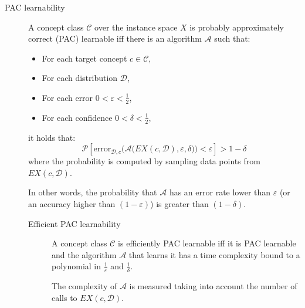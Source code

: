 \begin{description}
    \item[PAC learnability] 
        A concept class $\mathcal{C}$ over the instance space $X$ is probably approximately correct (PAC) learnable iff there is an algorithm $\mathcal{A}$ such that:
        \begin{itemize}
            \item For each target concept $c \in \mathcal{C}$,
            \item For each distribution $\mathcal{D}$, 
            \item For each error $0 < \varepsilon < \frac{1}{2}$,
            \item For each confidence $0 < \delta < \frac{1}{2}$,
        \end{itemize}
        it holds that:
        \[ \mathcal{P}\left[ \text{error}_{\mathcal{D}, c}\Big( \mathcal{A}\big( EX(c, \mathcal{D}), \varepsilon, \delta \big) \Big) < \varepsilon \right] > 1-\delta \]
        where the probability is computed by sampling data points from $EX(c, \mathcal{D})$.

        In other words, the probability that $\mathcal{A}$ has an error rate lower than $\varepsilon$ (or an accuracy higher than $(1-\varepsilon)$) is greater than $(1-\delta)$.

        \begin{description}
            \item[Efficient PAC learnability] 
                A concept class $\mathcal{C}$ is efficiently PAC learnable iff
                it is PAC learnable and the algorithm $\mathcal{A}$ that learns it has 
                a time complexity bound to a polynomial in $\frac{1}{\varepsilon}$ and $\frac{1}{\delta}$.

                \begin{remark}
                    The complexity of $\mathcal{A}$ is measured taking into account the number of calls to $EX(c, \mathcal{D})$.
                \end{remark}
        \end{description}
\end{description}

